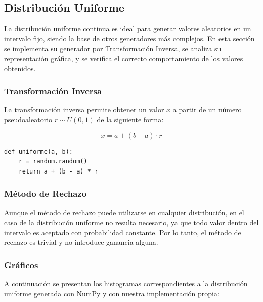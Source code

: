 \documentclass{article}
\begin{document}
\subsection{Distribución Uniforme}
La distribución uniforme continua es ideal para generar valores aleatorios en un intervalo fijo, siendo la base de otros generadores más complejos. En esta sección se implementa su generador por Transformación Inversa, se analiza su representación gráfica, y se verifica el correcto comportamiento de los valores obtenidos.

\subsubsection{Transformación Inversa}
La transformación inversa permite obtener un valor $x$ a partir de un número pseudoaleatorio $r \sim U(0,1)$ de la siguiente forma:

\[
x = a + (b - a) \cdot r
\]

\begin{verbatim}
def uniforme(a, b):
    r = random.random()
    return a + (b - a) * r
\end{verbatim}

\subsubsection{Método de Rechazo}
Aunque el método de rechazo puede utilizarse en cualquier distribución, en el caso de la distribución uniforme no resulta necesario, ya que todo valor dentro del intervalo es aceptado con probabilidad constante. Por lo tanto, el método de rechazo es trivial y no introduce ganancia alguna.

\subsubsection{Gráficos}
A continuación se presentan los histogramas correspondientes a la distribución uniforme generada con NumPy y con nuestra implementación propia:
\end{document}
